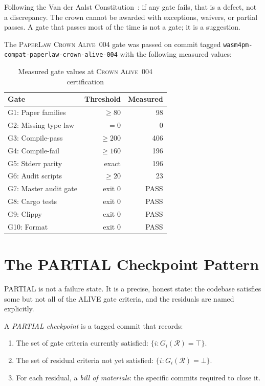 \begin{remark}
Following the Van der Aalst Constitution~\cite{vanderaalst2016process}: if any gate fails,
that is a defect, not a discrepancy. The crown cannot be awarded with exceptions, waivers,
or partial passes. A gate that passes most of the time is not a gate; it is a suggestion.
\end{remark}

The \textsc{PaperLaw Crown Alive~004} gate was passed on commit tagged
\texttt{wasm4pm-compat-paperlaw-crown-alive-004} with the following measured values:

\begin{table}[ht]
\centering
\caption{Measured gate values at \textsc{Crown Alive~004} certification}
\label{tab:crown-measurements}
\begin{tabular}{@{}lrr@{}}
\toprule
\textbf{Gate} & \textbf{Threshold} & \textbf{Measured} \\
\midrule
G1: Paper families       & $\geq 80$  & 98  \\
G2: Missing type law     & $= 0$      & 0   \\
G3: Compile-pass         & $\geq 200$ & 406 \\
G4: Compile-fail         & $\geq 160$ & 196 \\
G5: Stderr parity        & exact      & 196 \\
G6: Audit scripts        & $\geq 20$  & 23  \\
G7: Master audit gate    & exit 0     & PASS \\
G8: Cargo tests          & exit 0     & PASS \\
G9: Clippy               & exit 0     & PASS \\
G10: Format              & exit 0     & PASS \\
\bottomrule
\end{tabular}
\end{table}

\section{The PARTIAL Checkpoint Pattern}
\label{sec:doctrine-partial}

PARTIAL is not a failure state. It is a precise, honest state: the codebase satisfies some
but not all of the ALIVE gate criteria, and the residuals are named explicitly.

\begin{definition}
\label{def:partial}
A \emph{PARTIAL checkpoint} is a tagged commit that records:
\begin{enumerate}
  \item The set of gate criteria currently satisfied: $\{i : G_i(\mathcal{R}) = \top\}$.
  \item The set of residual criteria not yet satisfied: $\{i : G_i(\mathcal{R}) = \bot\}$.
  \item For each residual, a \emph{bill of materials}: the specific commits required to
        close it.
\end{enumerate}
\end{definition}

